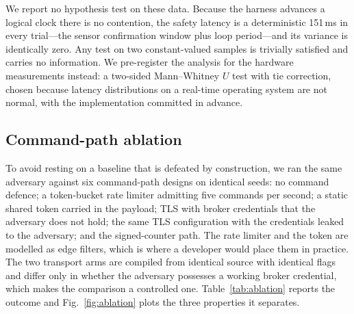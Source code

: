 We report no hypothesis test on these data. Because the harness advances a logical clock there
is no contention, the safety latency is a deterministic 151\,ms in every trial---the sensor
confirmation window plus loop period---and its variance is identically zero. Any test on two
constant-valued samples is trivially satisfied and carries no information. We pre-register the
analysis for the hardware measurements instead: a two-sided Mann--Whitney $U$ test with tie
correction, chosen because latency distributions on a real-time operating system are not normal,
with the implementation committed in advance.

\subsection{Command-path ablation}

To avoid resting on a baseline that is defeated by construction, we ran the same adversary
against six command-path designs on identical seeds: no command defence; a token-bucket rate limiter
admitting five commands per second; a static shared token carried in the payload; TLS with
broker credentials that the adversary does not hold; the same TLS configuration with the
credentials leaked to the adversary; and the signed-counter path. The rate limiter and the token
are modelled as edge filters, which is where a developer would place them in practice. The two
transport arms are compiled from identical source with identical flags and differ only in
whether the adversary possesses a working broker credential, which makes the comparison a
controlled one. Table~\ref{tab:ablation} reports the outcome and Fig.~\ref{fig:ablation} plots
the three properties it separates.

